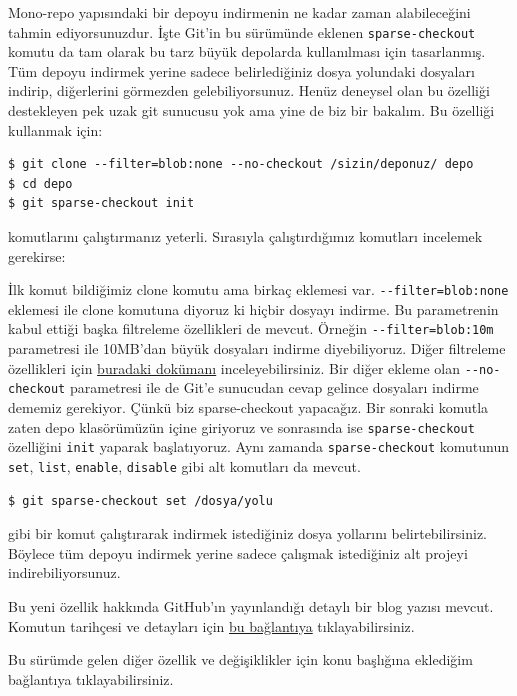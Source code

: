 \documentclass[11pt]{article}
\begin{document}
Mono-repo yapısındaki bir depoyu indirmenin ne kadar zaman alabileceğini
tahmin ediyorsunuzdur. İşte Git'in bu sürümünde eklenen \texttt{sparse-checkout}
komutu da tam olarak bu tarz büyük depolarda kullanılması için tasarlanmış.
Tüm depoyu indirmek yerine sadece belirlediğiniz dosya yolundaki dosyaları
indirip, diğerlerini görmezden gelebiliyorsunuz. Henüz deneysel olan bu
özelliği destekleyen pek uzak git sunucusu yok ama yine de biz bir bakalım. Bu
özelliği kullanmak için:

\begin{verbatim}
$ git clone --filter=blob:none --no-checkout /sizin/deponuz/ depo
$ cd depo
$ git sparse-checkout init
\end{verbatim}
komutlarını çalıştırmanız yeterli. Sırasıyla çalıştırdığımız komutları
incelemek gerekirse:

İlk komut bildiğimiz clone komutu ama birkaç eklemesi var.
\texttt{-{}-filter=blob:none} eklemesi ile clone komutuna diyoruz ki hiçbir dosyayı
indirme. Bu parametrenin kabul ettiği başka filtreleme özellikleri de mevcut.
Örneğin \texttt{-{}-filter=blob:10m} parametresi ile 10MB'dan büyük dosyaları indirme
diyebiliyoruz. Diğer filtreleme özellikleri için \href{https://github.com/git/git/blob/v2.25.0/Documentation/rev-list-options.txt\#L735-L780}{buradaki dokümanı}
inceleyebilirsiniz. Bir diğer ekleme olan \texttt{-{}-no-checkout} parametresi ile de
Git'e sunucudan cevap gelince dosyaları indirme dememiz gerekiyor. Çünkü biz
sparse-checkout yapacağız. Bir sonraki komutla zaten depo klasörümüzün içine
giriyoruz ve sonrasında ise \texttt{sparse-checkout} özelliğini \texttt{init} yaparak
başlatıyoruz. Aynı zamanda \texttt{sparse-checkout} komutunun \texttt{set}, \texttt{list},
\texttt{enable}, \texttt{disable} gibi alt komutları da mevcut.

\begin{verbatim}
$ git sparse-checkout set /dosya/yolu
\end{verbatim}
gibi bir komut çalıştırarak indirmek istediğiniz dosya yollarını
belirtebilirsiniz. Böylece tüm depoyu indirmek yerine sadece çalışmak
istediğiniz alt projeyi indirebiliyorsunuz.

Bu yeni özellik hakkında GitHub'ın yayınlandığı detaylı bir blog yazısı
mevcut. Komutun tarihçesi ve detayları için \href{https://github.blog/2020-01-17-bring-your-monorepo-down-to-size-with-sparse-checkout/}{bu bağlantıya} tıklayabilirsiniz.

Bu sürümde gelen diğer özellik ve değişiklikler için konu başlığına eklediğim
bağlantıya tıklayabilirsiniz.
\end{document}
